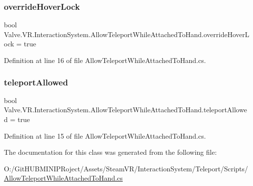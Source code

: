 \subsubsection{\texorpdfstring{overrideHoverLock}{overrideHoverLock}}
{\footnotesize\ttfamily bool Valve.\+V\+R.\+Interaction\+System.\+Allow\+Teleport\+While\+Attached\+To\+Hand.\+override\+Hover\+Lock = true}



Definition at line 16 of file Allow\+Teleport\+While\+Attached\+To\+Hand.\+cs.

\mbox{\label{class_valve_1_1_v_r_1_1_interaction_system_1_1_allow_teleport_while_attached_to_hand_a0b4bb44373b1273e58ea29e700b3c479}} 
\subsubsection{\texorpdfstring{teleportAllowed}{teleportAllowed}}
{\footnotesize\ttfamily bool Valve.\+V\+R.\+Interaction\+System.\+Allow\+Teleport\+While\+Attached\+To\+Hand.\+teleport\+Allowed = true}



Definition at line 15 of file Allow\+Teleport\+While\+Attached\+To\+Hand.\+cs.



The documentation for this class was generated from the following file\+:\begin{DoxyCompactItemize}
\item 
O\+:/\+Git\+H\+U\+B\+M\+I\+N\+I\+P\+Roject/\+Assets/\+Steam\+V\+R/\+Interaction\+System/\+Teleport/\+Scripts/\mbox{\hyperlink{_allow_teleport_while_attached_to_hand_8cs}{Allow\+Teleport\+While\+Attached\+To\+Hand.\+cs}}\end{DoxyCompactItemize}
